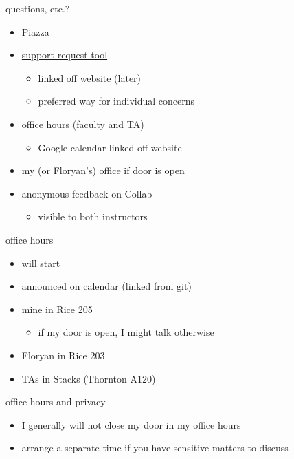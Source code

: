 \begin{frame}{questions, etc.?}
    \begin{itemize}
    \item Piazza 
    \item \href{https://libra.cs.virginia.edu/~pedagogy/index.php?redirect=support.php}{support request tool}
        \begin{itemize}
        \item linked off website (later)
        \item preferred way for individual concerns
        \end{itemize}
    \item office hours (faculty and TA)
        \begin{itemize}
        \item Google calendar linked off website
        \end{itemize}
    \item my (or Floryan's) office if door is open
    \item anonymous feedback on Collab
        \begin{itemize}
        \item visible to both instructors
        \end{itemize}
    \end{itemize}
\end{frame}

\begin{frame}{office hours}
    \begin{itemize}
        \item will start 
        \item announced on calendar (linked from git)
        \item mine in Rice 205
            \begin{itemize}
            \item if my door is open, I might talk otherwise
            \end{itemize}
        \item Floryan in Rice 203
        \item TAs in Stacks (Thornton A120)
    \end{itemize}
\end{frame}

\begin{frame}{office hours and privacy}
    \begin{itemize}
        \item I generally will not close my door in my office hours
        \item arrange a separate time if you have sensitive matters to discuss
    \end{itemize}
\end{frame}

